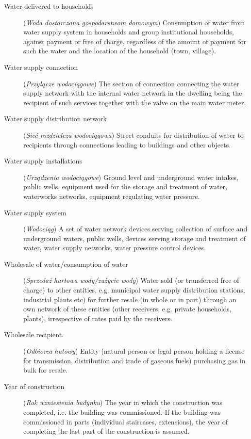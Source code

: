 \documentclass[12pt,a4paper]{article}
\begin{document}
\begin{description}
\item[Water delivered to households] (\textit{Woda dostarczona gospodarstwom domowym}) Consumption of water from water supply system in households and group institutional households, against payment or free of charge, regardless of the amount of payment for such the water and the location of the household (town, village).
\item[Water supply connection] (\textit{Przyłącze wodociągowe}) The section of connection connecting the water supply network with the internal water network in the dwelling being the recipient of such services together with the valve on the main water meter.
\item[Water supply distribution network] (\textit{Sieć rozdzielcza wodociągowa}) Street conduits for distribution of water to recipients through connections leading to buildings and other objects.
\item[Water supply installations] (\textit{Urządzenia wodociągowe}) Ground level and underground water intakes, public wells, equipment used for the storage and treatment of water, waterworks networks, equipment regulating water pressure.
\item[Water supply system] (\textit{Wodociąg}) A set of water network devices serving collection of surface and underground waters, public wells, devices serving storage and treatment of water, water supply networks, water pressure control devices.
\item[Wholesale of water/consumption of water] (\textit{Sprzedaż hurtowa wody/zużycie wody}) Water sold (or transferred free of charge) to other entities, e.g. municipal water supply distribution stations, industrial plants etc) for further resale (in whole or in part) through an own network of these entities (other receivers, e.g. private households, plants), irrespective of rates paid by the receivers.
\item[Wholesale recipient.] (\textit{Odbiorca hutowy}) Entity (natural person or legal person holding a license for transmission, distribution and trade of gaseous fuels) purchasing gas in bulk for resale.
\item[Year of construction] (\textit{Rok wzniesienia budynku}) The year in which the construction was completed, i.e. the building was commissioned. If the building was commissioned in parts (individual staircases, extensions), the year of completing the last part of the construction is assumed.
\end{description}
\end{document}
